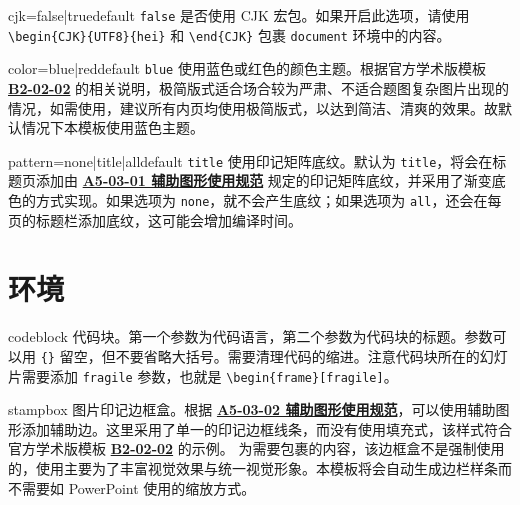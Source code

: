 \documentclass[a4paper,12pt]{article}
\begin{document}
\begin{CJK}{UTF8}{song}
\begin{docKey*}[SJTUBeamer]{cjk}{=false|true}{default \texttt{false}}
    是否使用 \textsf{CJK} 宏包。如果开启此选项，请使用 \verb"\begin{CJK}{UTF8}{hei}" 和 \verb"\end{CJK}" 包裹 \verb"document" 环境中的内容。
\end{docKey*}

\begin{docKey*}[SJTUBeamer]{color}{=blue|red}{default \texttt{blue}}
    使用蓝色或红色的颜色主题。根据官方学术版模板 \href{http://vi.sjtu.edu.cn/index.php/articles/app/8}{\textbf{B2-02-02}} 的相关说明，极简版式适合场合较为严肃、不适合题图复杂图片出现的情况，如需使用，建议所有内页均使用极简版式，以达到简洁、清爽的效果。故默认情况下本模板使用蓝色主题。
\end{docKey*}

\begin{docKey*}[SJTUBeamer]{pattern}{=none|title|all}{default \texttt{title}}
    使用印记矩阵底纹。默认为 \verb"title"，将会在标题页添加由 \href{http://vi.sjtu.edu.cn/index.php/articles/base/5}{\textbf{A5-03-01 辅助图形使用规范}} 规定的印记矩阵底纹，并采用了渐变底色的方式实现。如果选项为 \verb"none"，就不会产生底纹；如果选项为 \verb"all"，还会在每页的标题栏添加底纹，这可能会增加编译时间。
\end{docKey*}

\section{环境}

\begin{docEnvironment*}[doc parameter=\marg{language}\marg{title}, doclang/environment content=code]{codeblock}{}
    代码块。第一个参数为代码语言，第二个参数为代码块的标题。参数可以用 \verb"{}" 留空，但不要省略大括号。需要清理代码的缩进。注意代码块所在的幻灯片需要添加 \verb"fragile" 参数，也就是 \verb"\begin{frame}[fragile]"。
\end{docEnvironment*}

\begin{docEnvironment*}[doclang/environment content=code]{stampbox}{}
    图片印记边框盒。根据 \href{http://vi.sjtu.edu.cn/index.php/articles/base/5}{\textbf{A5-03-02 辅助图形使用规范}}，可以使用辅助图形添加辅助边。这里采用了单一的印记边框线条，而没有使用填充式，该样式符合官方学术版模板 \href{http://vi.sjtu.edu.cn/index.php/articles/app/8}{\textbf{B2-02-02}} 的示例。 为需要包裹的内容，该边框盒不是强制使用的，使用主要为了丰富视觉效果与统一视觉形象。本模板将会自动生成边栏样条而不需要如 PowerPoint 使用的缩放方式。
\end{docEnvironment*}


\end{CJK}
\end{document}
